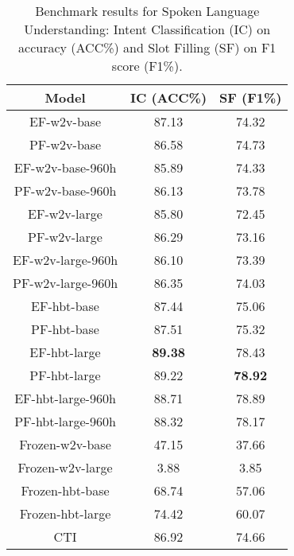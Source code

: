 \documentclass{article}
\begin{document}
\begin{table}[th]
  \centering
  \caption{Benchmark results for Spoken Language Understanding: Intent Classification (IC) on accuracy (ACC\%) and Slot Filling (SF) on F1 score (F1\%).
}
  \label{tab:example}
  \centering
  \begin{tabular}{ccc}
    \toprule
    \multicolumn{1}{c}{\textbf{Model}} &   \multicolumn{1}{c}{\textbf{IC (ACC\%)}}   &
    \multicolumn{1}{c}{\textbf{SF (F1\%)}}\\
    \midrule
    EF-w2v-base          & 87.13 & 74.32 \\
    PF-w2v-base          & 86.58 & 74.73 \\
    EF-w2v-base-960h     & 85.89 & 74.33  \\
    PF-w2v-base-960h     & 86.13 & 73.78  \\
    \midrule
    EF-w2v-large          & 85.80 & 72.45 \\
    PF-w2v-large          & 86.29 & 73.16 \\
    EF-w2v-large-960h     & 86.10 & 73.39  \\
    PF-w2v-large-960h     & 86.35 & 74.03  \\
    \midrule
    EF-hbt-base          & 87.44 & 75.06 \\
    PF-hbt-base          & 87.51 & 75.32 \\
    \midrule
    EF-hbt-large          &  \textbf{89.38} & 78.43 \\
    PF-hbt-large          & 89.22 & \textbf{78.92} \\
    EF-hbt-large-960h     & 88.71 & 78.89  \\
    PF-hbt-large-960h     & 88.32 & 78.17  \\
    \midrule
    Frozen-w2v-base & 47.15 & 37.66 \\
    Frozen-w2v-large & 3.88 & 3.85 \\
    Frozen-hbt-base & 68.74 & 57.06 \\
    Frozen-hbt-large & 74.42 & 60.07 \\
    
    \midrule
    CTI\cite{CTI} & 86.92 & 74.66  \\
    \bottomrule
  \end{tabular}
  
\end{table}
\end{document}
